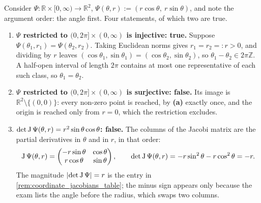 \begin{example}
\label{ex:polar_coordinates_checklist}
Consider $\Psi : \mathbb{R}\times[0,\infty) \to \mathbb{R}^2$,
$\Psi(\theta, r) := (r\cos\theta,\ r\sin\theta)$, and note the argument order: the angle first.
Four statements, of which two are true.
\begin{enumerate}[label=\textbf{(\alph*)}]
  \item \textbf{$\Psi$ restricted to $(0,2\pi]\times(0,\infty)$ is injective: true.} Suppose
    $\Psi(\theta_1,r_1) = \Psi(\theta_2,r_2)$. Taking Euclidean norms gives $r_1 = r_2 =: r > 0$,
    and dividing by $r$ leaves $(\cos\theta_1,\sin\theta_1) = (\cos\theta_2,\sin\theta_2)$, so
    $\theta_1 - \theta_2 \in 2\pi\mathbb{Z}$. A half-open interval of length $2\pi$ contains at
    most one representative of each such class, so $\theta_1 = \theta_2$.
  \item \textbf{$\Psi$ restricted to $(0,2\pi]\times(0,\infty)$ is surjective: false.} Its image is
    $\mathbb{R}^2\setminus\{(0,0)\}$: every non-zero point is reached, by \textbf{(a)} exactly
    once, and the origin is reached only from $r = 0$, which the restriction excludes.
  \item \textbf{$\det\operatorname{J}\Psi(\theta,r) = r^2\sin\theta\cos\theta$: false.} The columns of the
    Jacobi matrix are the partial derivatives in $\theta$ and in $r$, in that order:
    \[\operatorname{J}\Psi(\theta,r) = \begin{pmatrix} -r\sin\theta & \cos\theta \\
      r\cos\theta & \sin\theta\end{pmatrix}, \qquad
      \det\operatorname{J}\Psi(\theta,r) = -r\sin^2\theta - r\cos^2\theta = -r .\]
    The magnitude $\lvert\det\operatorname{J}\Psi\rvert = r$ is the entry in
    \cref{rem:coordinate_jacobians_table}; the minus sign appears only because the exam lists the
    angle before the radius, which swaps two columns.

\end{enumerate}
\end{example}
